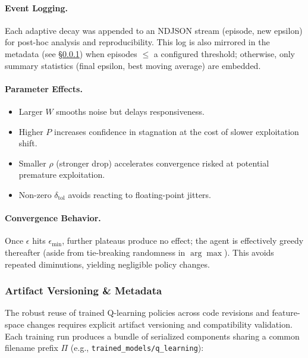 \paragraph{Event Logging.}
Each adaptive decay was appended to an NDJSON stream (episode, new epsilon) for post-hoc analysis and reproducibility. This log is also mirrored in the metadata (see \S\ref{subsubsec:qlearn-artifacts}) when episodes $\le$ a configured threshold; otherwise, only summary statistics (final epsilon, best moving average) are embedded.

\paragraph{Parameter Effects.}
\begin{itemize}
  \item Larger $W$ smooths noise but delays responsiveness.
  \item Higher $P$ increases confidence in stagnation at the cost of slower exploitation shift.
  \item Smaller $\rho$ (stronger drop) accelerates convergence risked at potential premature exploitation.
  \item Non-zero $\delta_{\text{tol}}$ avoids reacting to floating-point jitters.
\end{itemize}

\paragraph{Convergence Behavior.}
Once $\epsilon$ hits $\epsilon_{\min}$, further plateaus produce no effect; the agent is effectively greedy thereafter (aside from tie-breaking randomness in $\arg\max$). This avoids repeated diminutions, yielding negligible policy changes.

\subsubsection{Artifact Versioning \& Metadata}
\label{subsubsec:qlearn-artifacts}

The robust reuse of trained Q-learning policies across code revisions and feature-space changes requires explicit artifact versioning and compatibility validation. Each training run produces a bundle of serialized components sharing a common filename prefix $\Pi$ (e.g., \texttt{trained\_models/q\_learning}):

